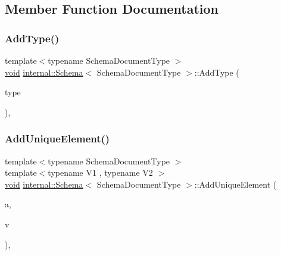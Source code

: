 \subsection{Member Function Documentation}
\mbox{\label{classinternal_1_1Schema_a472b5cecb9cddc7b4ef0dcdedeb005ba}} 
\subsubsection{\texorpdfstring{Add\+Type()}{AddType()}}
{\footnotesize\ttfamily template$<$typename Schema\+Document\+Type $>$ \\
\hyperlink{imgui__impl__opengl3__loader_8h_ac668e7cffd9e2e9cfee428b9b2f34fa7}{void} \hyperlink{classinternal_1_1Schema}{internal\+::\+Schema}$<$ Schema\+Document\+Type $>$\+::Add\+Type (\begin{DoxyParamCaption}\item[{const \hyperlink{classinternal_1_1Schema_a8976b6d7e2a885483d0b51d941019340}{Value\+Type} \&}]{type }\end{DoxyParamCaption})\hspace{0.3cm}{\ttfamily [inline]}, {\ttfamily [private]}}

\mbox{\label{classinternal_1_1Schema_a948f4dbe9b9b70ba6b6e33abeb4b1e4f}} 
\subsubsection{\texorpdfstring{Add\+Unique\+Element()}{AddUniqueElement()}}
{\footnotesize\ttfamily template$<$typename Schema\+Document\+Type $>$ \\
template$<$typename V1 , typename V2 $>$ \\
\hyperlink{imgui__impl__opengl3__loader_8h_ac668e7cffd9e2e9cfee428b9b2f34fa7}{void} \hyperlink{classinternal_1_1Schema}{internal\+::\+Schema}$<$ Schema\+Document\+Type $>$\+::Add\+Unique\+Element (\begin{DoxyParamCaption}\item[{V1 \&}]{a,  }\item[{const V2 \&}]{v }\end{DoxyParamCaption})\hspace{0.3cm}{\ttfamily [inline]}, {\ttfamily [private]}}

